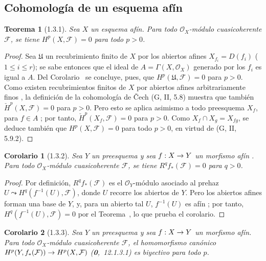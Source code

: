 \documentclass[10pt,oneside,openany]{book}
\theoremstyle{egaenv}\newtheorem*{env}{---}
\theoremstyle{egastatement}
\newtheorem*{theorem}{Teorema}
\newtheorem*{corollary}{Corolario}
\theoremstyle{egadescription}
\renewcommand{\leq}{\leqslant}
\renewcommand{\to}{\mathchoice{\longrightarrow}{\rightarrow}{\rightarrow}{\rightarrow}}
\begin{document}
\subsection{Cohomología de un esquema afín}
\label{subsection:III.1.3}
\label{subsection:III.1.3-fr}

\begin{theorem}[1.3.1]
\label{III.1.3.1}
\label{III.1.3.1-fr}
Sea $X$ un esquema afín.
Para todo $\mathcal O_X$-módulo cuasicoherente $\mathcal F$, se tiene $H^p(X,\mathcal F)=0$ para todo $p>0$.
\end{theorem}

\begin{proof}
Sea $\mathfrak U$ un recubrimiento finito de $X$ por los abiertos afines $X_{f_i}=D(f_i)$ ($1\leq i\leq r$); se sabe entonces que el ideal de $A=\Gamma(X,\mathcal O_X)$ generado por los $f_i$ es igual a $A$.
Del Corolario~ se concluye, pues, que $H^p(\mathfrak U,\mathcal F)=0$ para $p>0$.
Como existen recubrimientos finitos de $X$ por abiertos afines arbitrariamente finos , la definición de la cohomología de \v Cech (G, II, 5.8) muestra que también $\check H^p(X,\mathcal F)=0$ para $p>0$.
Pero esto se aplica asimismo a todo preesquema $X_f$, para $f\in A$ ; por tanto, $\check H^p(X_f,\mathcal F)=0$ para $p>0$.
Como $X_f\cap X_g=X_{fg}$, se deduce también que $H^p(X,\mathcal F)=0$ para todo $p>0$, en virtud de (G, II, 5.9.2).
\end{proof}

\begin{corollary}[1.3.2]
\label{III.1.3.2}
\label{III.1.3.2-fr}
Sea $Y$ un preesquema y sea $f:X\to Y$ un morfismo afín .
Para todo $\mathcal O_X$-módulo cuasicoherente $\mathcal F$, se tiene $R^qf_*(\mathcal F)=0$ para $q>0$.
\end{corollary}

\begin{proof}
Por definición, $R^qf_*(\mathcal F)$ es el $\mathcal O_Y$-módulo asociado al prehaz $U\leadsto H^q(f^{-1}(U),\mathcal F)$, donde $U$ recorre los abiertos de $Y$.
Pero los abiertos afines forman una base de $Y$, y, para un abierto tal $U$, $f^{-1}(U)$ es afín ; por tanto, $H^q(f^{-1}(U),\mathcal F)=0$ por el Teorema~, lo que prueba el corolario.
\end{proof}

\begin{corollary}[1.3.3]
\label{III.1.3.3}
\label{III.1.3.3-fr}
Sea $Y$ un preesquema y sea $f:X\to Y$ un morfismo afín.
Para todo $\mathcal O_X$-módulo cuasicoherente $\mathcal F$, el homomorfismo canónico $H^p(Y,f_*(\mathcal F))\to H^p(X,\mathcal F)$ \textup{(\textbf{0},~12.1.3.1)} es biyectivo para todo $p$.
\end{corollary}
\end{document}
